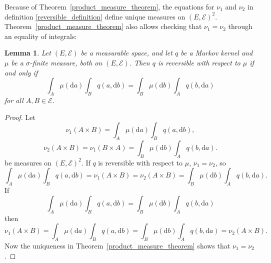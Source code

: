 \documentclass[english,twoside,openright]{HYgraduMLDS}
\newtheorem{lemma}{Lemma}[chapter]
\newcommand{\dx}{\mathrm{d}}
\begin{document}
Because of Theorem~\ref{product_measure_theorem}, the equations for
\(\nu_{1}\) and \(\nu_{2}\) in definition \ref{reversible_definition} define
unique measures on \((E, \mathcal{E})^{2}\). Theorem~\ref{product_measure_theorem}
also allows checking that \(\nu_{1} = \nu_{2}\) through an equality of
integrals:
\begin{lemma}\label{reversible_check_lemma}
	Let \((E, \mathcal{E})\) be a measurable space, and let \(q\) be a Markov
  kernel and \(\mu\) be a \(\sigma\)-finite measure, both on \((E, \mathcal{E})\).
  Then \(q\) is reversible with respect to \(\mu\) if and only if
  \[
    \int_{A}\mu(\dx a)\int_{B}q(a, \dx b)
    = \int_{B}\mu(\dx b)\int_{A}q(b, \dx a)
  \]
  for all \(A, B\in \mathcal{E}\).
\end{lemma}
\begin{proof}
  Let
  \[
    \nu_{1}(A\times B) = \int_{A}\mu(\dx a)\int_{B}q(a, \dx b),
  \]
  \[
    \nu_{2}(A\times B) = \nu_{1}(B\times A) = \int_{B}\mu(\dx b)\int_{A}q(b, \dx a).
  \]
  be measures on \((E, \mathcal{E})^{2}\). If \(q\) is reversible with respect to
  \(\mu\), \(\nu_{1} = \nu_{2}\), so
  \[
    \int_{A}\mu(\dx a)\int_{B}q(a, \dx b) = \nu_{1}(A\times B) = \nu_{2}(A\times B)
    = \int_{B}\mu(\dx b)\int_{A}q(b, \dx a).
  \]
  If
  \[
    \int_{A}\mu(\dx a)\int_{B}q(a, \dx b)
    = \int_{B}\mu(\dx b)\int_{A}q(b, \dx a)
  \]
  then
  \[
    \nu_{1}(A\times B) = \int_{A}\mu(\dx a)\int_{B}q(a, \dx b)
    = \int_{B}\mu(\dx b)\int_{A}q(b, \dx a) = \nu_{2}(A\times B).
  \]
  Now the uniqueness in Theorem~\ref{product_measure_theorem} shows that
  \(\nu_{1} = \nu_{2}\).
\end{proof}
\end{document}
